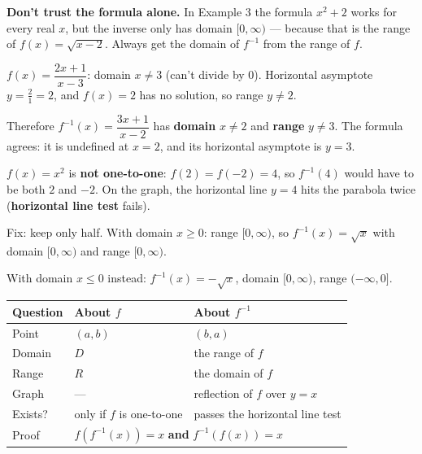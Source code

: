 \documentclass[11pt,letterpaper]{article}
\newcommand{\finv}{f^{-1}}
\begin{document}
\begin{warn}
\textbf{Don't trust the formula alone.} In Example 3 the formula $x^2+2$ works for every real $x$, but the inverse only has domain $[0,\infty)$ — because that is the range of $f(x)=\sqrt{x-2}$. Always get the domain of $\finv$ from the range of $f$.
\end{warn}

\begin{example}
$f(x)=\dfrac{2x+1}{x-3}$: domain $x\neq3$ (can't divide by $0$). Horizontal asymptote $y=\frac{2}{1}=2$, and $f(x)=2$ has no solution, so range $y\neq2$.\par
Therefore $\finv(x)=\dfrac{3x+1}{x-2}$ has \textbf{domain} $x\neq2$ and \textbf{range} $y\neq3$. The formula agrees: it is undefined at $x=2$, and its horizontal asymptote is $y=3$. \checkmark
\end{example}

\begin{example}
$f(x)=x^2$ is \textbf{not one-to-one}: $f(2)=f(-2)=4$, so $\finv(4)$ would have to be both $2$ and $-2$. On the graph, the horizontal line $y=4$ hits the parabola twice (\textbf{horizontal line test} fails).\par
Fix: keep only half. With domain $x\ge0$: range $[0,\infty)$, so $\finv(x)=\sqrt{x}$ with domain $[0,\infty)$ and range $[0,\infty)$.\par
With domain $x\le0$ instead: $\finv(x)=-\sqrt{x}$, domain $[0,\infty)$, range $(-\infty,0]$.
\end{example}

\begin{center}
\renewcommand{\arraystretch}{1.25}
\begin{tabular}{@{}lll@{}}
\toprule
\textbf{Question} & \textbf{About $f$} & \textbf{About $\finv$}\\ \midrule
Point & $(a,b)$ & $(b,a)$\\
Domain & $D$ & the range of $f$\\
Range & $R$ & the domain of $f$\\
Graph & — & reflection of $f$ over $y=x$\\
Exists? & only if $f$ is one-to-one & passes the horizontal line test\\
Proof & \multicolumn{2}{l}{$f(\finv(x))=x$ \textbf{and} $\finv(f(x))=x$}\\
\bottomrule
\end{tabular}
\end{center}
\end{document}

